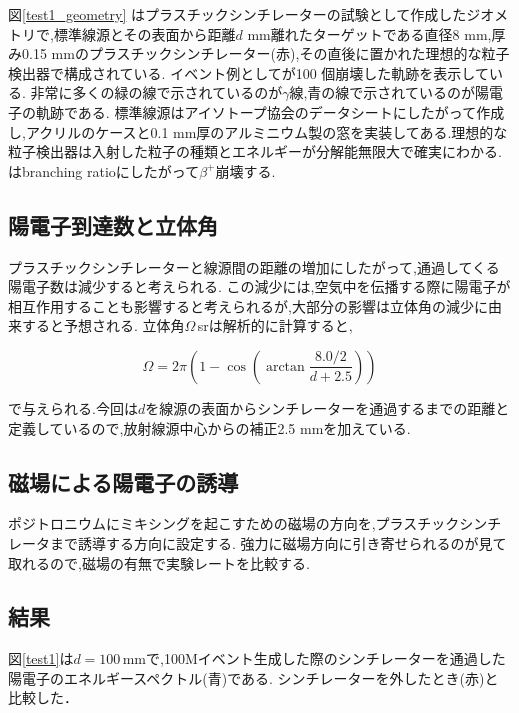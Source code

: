 図\ref{test1_geometry} はプラスチックシンチレーターの試験として作成したジオメトリで,標準線源とその表面から距離$d$ mm離れたターゲットである直径8 mm,厚み0.15 mmのプラスチックシンチレーター(赤),その直後に置かれた理想的な粒子検出器で構成されている.
イベント例としてが100 個崩壊した軌跡を表示している.
非常に多くの緑の線で示されているのが$\gamma$線,青の線で示されているのが陽電子の軌跡である.
標準線源はアイソトープ協会のデータシートにしたがって作成し,アクリルのケースと0.1 mm厚のアルミニウム製の窓を実装してある.理想的な粒子検出器は入射した粒子の種類とエネルギーが分解能無限大で確実にわかる.
はbranching ratioにしたがって$\beta^+$崩壊する.

\subsection{陽電子到達数と立体角}

プラスチックシンチレーターと線源間の距離の増加にしたがって,通過してくる陽電子数は減少すると考えられる.
この減少には,空気中を伝播する際に陽電子が相互作用することも影響すると考えられるが,大部分の影響は立体角の減少に由来すると予想される.
立体角$\Omega$\,srは解析的に計算すると,

\begin{equation}
	\nonumber
	\Omega = 2\pi \left( 1-\cos\left(\arctan\frac{8.0/2}{d+2.5}\right)\right)
\end{equation}

で与えられる.今回は$d$を線源の表面からシンチレーターを通過するまでの距離と定義しているので,放射線源中心からの補正2.5 mmを加えている.

\subsection{磁場による陽電子の誘導}
ポジトロニウムにミキシングを起こすための磁場の方向を,プラスチックシンチレータまで誘導する方向に設定する.
強力に磁場方向に引き寄せられるのが見て取れるので,磁場の有無で実験レートを比較する.

\subsection{結果}

図\ref{test1}は$d=100$\,mmで,100Mイベント生成した際のシンチレーターを通過した陽電子のエネルギースペクトル(青)である. シンチレーターを外したとき(赤)と比較した．

